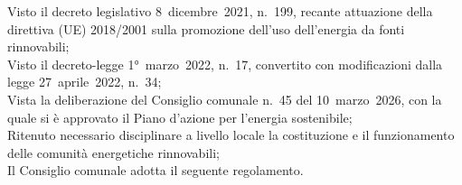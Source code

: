 \documentclass[%
  bozza,          %
  sansserif,      %
  simplex,        %
  12pt            %
]{attinormativi}
\begin{document}
%
%

\maketitle            %


\bozzainfo


\tableofcontents
\indicearticoli


\begin{preambolo}
Visto il decreto legislativo 8~dicembre~2021, n.~199, recante attuazione
della direttiva (UE) 2018/2001 sulla promozione dell'uso dell'energia da
fonti rinnovabili;\\
Visto il decreto-legge 1°~marzo~2022, n.~17, convertito con modificazioni
dalla legge 27~aprile~2022, n.~34;\\
Vista la deliberazione del Consiglio comunale n.~45 del 10~marzo~2026,
con la quale si è approvato il Piano d'azione per l'energia sostenibile;\\
Ritenuto necessario disciplinare a livello locale la costituzione e il
funzionamento delle comunità energetiche rinnovabili;\\
Il Consiglio comunale adotta il seguente regolamento.
\end{preambolo}
\end{document}
